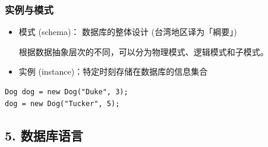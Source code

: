 \documentclass[aspectratio=169, 14pt]{beamer}
\begin{document}
\begin{frame}[fragile]
	\frametitle{实例与模式}
	\begin{itemize}
		\item \alert{模式 (schema)}： 数据库的整体设计 (台湾地区译为「綱要」)

		      根据数据抽象层次的不同，可以分为物理模式、逻辑模式和子模式。
		\item \alert{实例 (instance)}：特定时刻存储在数据库的信息集合
	\end{itemize}
	\begin{verbatim}
Dog dog = new Dog("Duke", 3);
dog = new Dog("Tucker", 5);
\end{verbatim}

\end{frame}

\begin{frame}
	\section{\textcolor{darkmidnightblue}{5. 数据库语言}}
	\Huge{} \Large{} \Huge{}
\end{frame}
\end{document}

